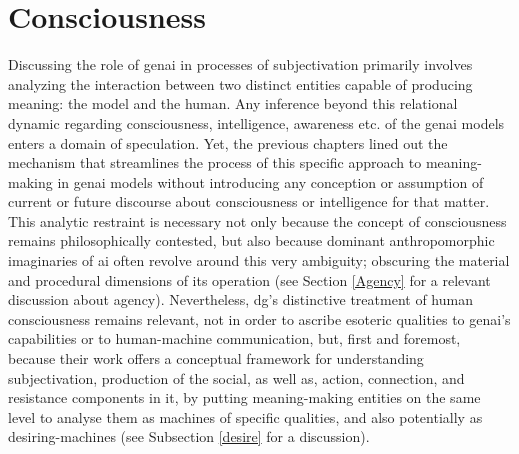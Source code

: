 \section{Consciousness}


Discussing the role of \gls{genai} in processes of subjectivation primarily involves analyzing the interaction between two distinct entities capable of producing meaning: the model and the human. Any inference beyond this relational dynamic regarding consciousness, intelligence, awareness etc. of the \gls{genai} models  enters a domain of speculation. Yet, the
previous chapters lined out the mechanism that streamlines the process of this
specific approach to meaning-making in \gls{genai} models without introducing
any conception or assumption of current or future discourse about
consciousness or intelligence for that matter. This analytic restraint is necessary not only because the concept of consciousness remains philosophically contested, but also because dominant anthropomorphic imaginaries of \gls{ai} often revolve around this very ambiguity; obscuring the material and procedural dimensions of its operation (see Section \ref{Agency} for a relevant discussion about agency).
Nevertheless, \gls{dg}'s  distinctive treatment of human consciousness remains relevant, not in order to ascribe esoteric qualities to \gls{genai}'s capabilities or to human-machine communication, but, first and foremost, because their work offers a conceptual framework for understanding subjectivation, production of the social, as well as, action, connection,  and resistance components in it, by putting meaning-making entities on the same level to analyse them as machines of specific qualities, and also potentially as desiring-machines (see Subsection \ref{desire} for a discussion).

